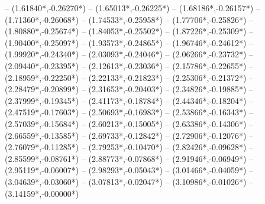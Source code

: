 {	-- ({1.61840*\dx},{-0.26270*\dy})
	-- ({1.65013*\dx},{-0.26225*\dy})
	-- ({1.68186*\dx},{-0.26157*\dy})
	-- ({1.71360*\dx},{-0.26068*\dy})
	-- ({1.74533*\dx},{-0.25958*\dy})
	-- ({1.77706*\dx},{-0.25826*\dy})
	-- ({1.80880*\dx},{-0.25674*\dy})
	-- ({1.84053*\dx},{-0.25502*\dy})
	-- ({1.87226*\dx},{-0.25309*\dy})
	-- ({1.90400*\dx},{-0.25097*\dy})
	-- ({1.93573*\dx},{-0.24865*\dy})
	-- ({1.96746*\dx},{-0.24612*\dy})
	-- ({1.99920*\dx},{-0.24340*\dy})
	-- ({2.03093*\dx},{-0.24046*\dy})
	-- ({2.06266*\dx},{-0.23732*\dy})
	-- ({2.09440*\dx},{-0.23395*\dy})
	-- ({2.12613*\dx},{-0.23036*\dy})
	-- ({2.15786*\dx},{-0.22655*\dy})
	-- ({2.18959*\dx},{-0.22250*\dy})
	-- ({2.22133*\dx},{-0.21823*\dy})
	-- ({2.25306*\dx},{-0.21372*\dy})
	-- ({2.28479*\dx},{-0.20899*\dy})
	-- ({2.31653*\dx},{-0.20403*\dy})
	-- ({2.34826*\dx},{-0.19885*\dy})
	-- ({2.37999*\dx},{-0.19345*\dy})
	-- ({2.41173*\dx},{-0.18784*\dy})
	-- ({2.44346*\dx},{-0.18204*\dy})
	-- ({2.47519*\dx},{-0.17603*\dy})
	-- ({2.50693*\dx},{-0.16983*\dy})
	-- ({2.53866*\dx},{-0.16343*\dy})
	-- ({2.57039*\dx},{-0.15684*\dy})
	-- ({2.60213*\dx},{-0.15005*\dy})
	-- ({2.63386*\dx},{-0.14306*\dy})
	-- ({2.66559*\dx},{-0.13585*\dy})
	-- ({2.69733*\dx},{-0.12842*\dy})
	-- ({2.72906*\dx},{-0.12076*\dy})
	-- ({2.76079*\dx},{-0.11285*\dy})
	-- ({2.79253*\dx},{-0.10470*\dy})
	-- ({2.82426*\dx},{-0.09628*\dy})
	-- ({2.85599*\dx},{-0.08761*\dy})
	-- ({2.88773*\dx},{-0.07868*\dy})
	-- ({2.91946*\dx},{-0.06949*\dy})
	-- ({2.95119*\dx},{-0.06007*\dy})
	-- ({2.98293*\dx},{-0.05043*\dy})
	-- ({3.01466*\dx},{-0.04059*\dy})
	-- ({3.04639*\dx},{-0.03060*\dy})
	-- ({3.07813*\dx},{-0.02047*\dy})
	-- ({3.10986*\dx},{-0.01026*\dy})
	-- ({3.14159*\dx},{-0.00000*\dy})
}
